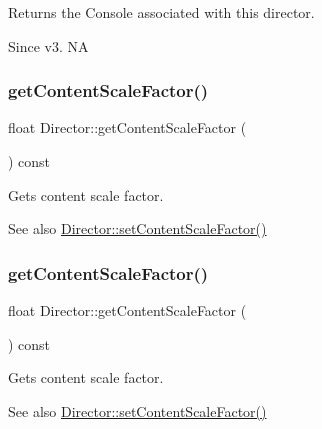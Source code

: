 Returns the Console associated with this director. \begin{DoxySince}{Since}
v3.  NA 
\end{DoxySince}
\mbox{\label{classDirector_a233085ea94b316a44313e4120029f2a4}} 
\subsubsection{\texorpdfstring{get\+Content\+Scale\+Factor()}{getContentScaleFactor()}\hspace{0.1cm}{\footnotesize\ttfamily [1/2]}}
{\footnotesize\ttfamily float Director\+::get\+Content\+Scale\+Factor (\begin{DoxyParamCaption}{ }\end{DoxyParamCaption}) const\hspace{0.3cm}{\ttfamily [inline]}}

Gets content scale factor. \begin{DoxySeeAlso}{See also}
\hyperlink{classDirector_a0eef2543f7619fc1539a22b6cfe42acb}{Director\+::set\+Content\+Scale\+Factor()} 
\end{DoxySeeAlso}
\mbox{\label{classDirector_a233085ea94b316a44313e4120029f2a4}} 
\subsubsection{\texorpdfstring{get\+Content\+Scale\+Factor()}{getContentScaleFactor()}\hspace{0.1cm}{\footnotesize\ttfamily [2/2]}}
{\footnotesize\ttfamily float Director\+::get\+Content\+Scale\+Factor (\begin{DoxyParamCaption}{ }\end{DoxyParamCaption}) const\hspace{0.3cm}{\ttfamily [inline]}}

Gets content scale factor. \begin{DoxySeeAlso}{See also}
\hyperlink{classDirector_a0eef2543f7619fc1539a22b6cfe42acb}{Director\+::set\+Content\+Scale\+Factor()} 
\end{DoxySeeAlso}
\mbox{\label{classDirector_ae5984b5ba756d210fa4ec79578d17ca8}} 
